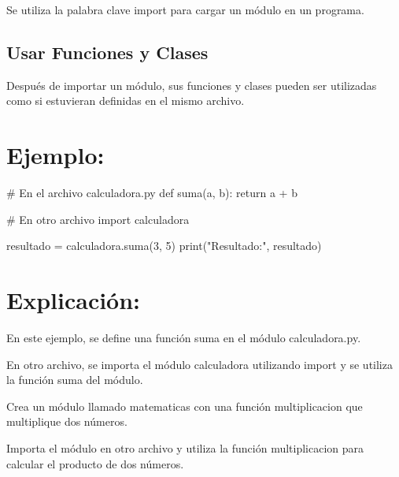 \documentclass[
  a4paper,
  DIV=11,
  numbers=noendperiod,
  onepage,
  openany]{scrreprt}
\newenvironment{Shaded}{\begin{snugshade}}{\end{snugshade}}
\newcommand{\BuiltInTok}[1]{\textcolor[rgb]{0.00,0.23,0.31}{#1}}
\newcommand{\CommentTok}[1]{\textcolor[rgb]{0.37,0.37,0.37}{#1}}
\newcommand{\ControlFlowTok}[1]{\textcolor[rgb]{0.00,0.23,0.31}{#1}}
\newcommand{\DecValTok}[1]{\textcolor[rgb]{0.68,0.00,0.00}{#1}}
\newcommand{\ImportTok}[1]{\textcolor[rgb]{0.00,0.46,0.62}{#1}}
\newcommand{\KeywordTok}[1]{\textcolor[rgb]{0.00,0.23,0.31}{#1}}
\newcommand{\NormalTok}[1]{\textcolor[rgb]{0.00,0.23,0.31}{#1}}
\newcommand{\OperatorTok}[1]{\textcolor[rgb]{0.37,0.37,0.37}{#1}}
\newcommand{\StringTok}[1]{\textcolor[rgb]{0.13,0.47,0.30}{#1}}
\begin{document}
Se utiliza la palabra clave import para cargar un módulo en un programa.

\hypertarget{usar-funciones-y-clases-1}{%
\subsection{Usar Funciones y Clases}\label{usar-funciones-y-clases-1}}

Después de importar un módulo, sus funciones y clases pueden ser
utilizadas como si estuvieran definidas en el mismo archivo.

\hypertarget{ejemplo-59}{%
\section{Ejemplo:}\label{ejemplo-59}}

\begin{Shaded}
\begin{Highlighting}[]
\CommentTok{\# En el archivo calculadora.py}
\KeywordTok{def}\NormalTok{ suma(a, b):}
    \ControlFlowTok{return}\NormalTok{ a }\OperatorTok{+}\NormalTok{ b}

\CommentTok{\# En otro archivo}
\ImportTok{import}\NormalTok{ calculadora}

\NormalTok{resultado }\OperatorTok{=}\NormalTok{ calculadora.suma(}\DecValTok{3}\NormalTok{, }\DecValTok{5}\NormalTok{)}
\BuiltInTok{print}\NormalTok{(}\StringTok{"Resultado:"}\NormalTok{, resultado)}
\end{Highlighting}
\end{Shaded}

\hypertarget{explicaciuxf3n-59}{%
\section{Explicación:}\label{explicaciuxf3n-59}}

En este ejemplo, se define una función suma en el módulo calculadora.py.

En otro archivo, se importa el módulo calculadora utilizando import y se
utiliza la función suma del módulo.

\begin{tcolorbox}[enhanced jigsaw, colbacktitle=quarto-callout-important-color!10!white, toprule=.15mm, leftrule=.75mm, titlerule=0mm, opacityback=0, rightrule=.15mm, opacitybacktitle=0.6, breakable, left=2mm, coltitle=black, title=\textcolor{quarto-callout-important-color}{\faExclamation}\hspace{0.5em}{Actividad Práctica:}, toptitle=1mm, bottomtitle=1mm, arc=.35mm, bottomrule=.15mm, colback=white, colframe=quarto-callout-important-color-frame]

Crea un módulo llamado matematicas con una función multiplicacion que
multiplique dos números.

Importa el módulo en otro archivo y utiliza la función multiplicacion
para calcular el producto de dos números.

\end{tcolorbox}
\end{document}
